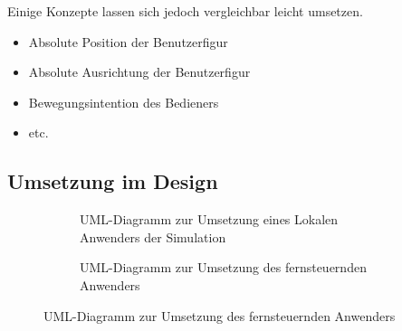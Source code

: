 Einige Konzepte lassen sich jedoch vergleichbar leicht umsetzen.
\begin{itemize}
\item Absolute Position der Benutzerfigur
\item Absolute Ausrichtung der Benutzerfigur
\item Bewegungsintention des Bedieners
\item etc.
\end{itemize}

\subsection{Umsetzung im Design}

\begin{figure}
\centering
\begin{subfigure}[b]{0.3\textwidth}
\centering
{}
\caption{UML-Diagramm zur Umsetzung eines Lokalen Anwenders der Simulation}
\label{fig:local}

\end{subfigure}
\begin{subfigure}[b]{0.3\textwidth}
\centering
{}
\caption{UML-Diagramm zur Umsetzung des fernsteuernden Anwenders}
\label{fig:remotecontrol_indiv}
\end{subfigure}
\label{fig:remotecontrol_design}
\end{figure}

